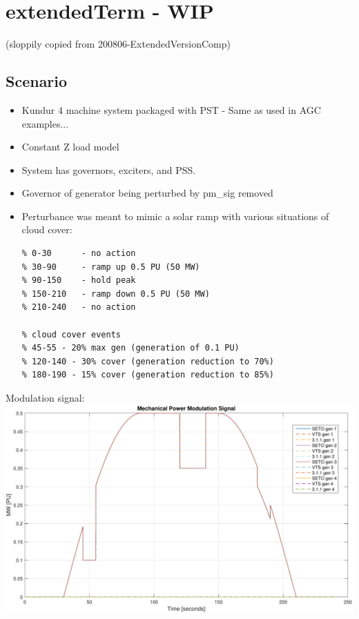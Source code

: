 \section{extendedTerm - WIP}
(sloppily copied from 200806-ExtendedVersionComp)

\subsection{Scenario} 
 \begin{center}
\begin{itemize}
\footnotesize
\raggedright
\singlespacing
\itemsep 0em
\item Kundur  4 machine system packaged with PST - Same as used in AGC examples...
\item Constant Z load model
\item System has governors, exciters, and PSS.
\item Governor of generator being perturbed by pm\_sig removed
\item Perturbance was meant to mimic a solar ramp with various situations of cloud cover:\\
\begin{Verbatim}[fontsize=\scriptsize]
% time [seconds]
% 0-30      - no action
% 30-90     - ramp up 0.5 PU (50 MW)
% 90-150    - hold peak
% 150-210   - ramp down 0.5 PU (50 MW)
% 210-240   - no action

% cloud cover events
% 45-55 - 20% max gen (generation of 0.1 PU)
% 120-140 - 30% cover (generation reduction to 70%)
% 180-190 - 15% cover (generation reduction to 85%)
\end{Verbatim}
\end{itemize}

Modulation signal:
\includegraphics[width=.8\linewidth]{examples/extendedTerm/verPmSig}
\end{center}


\pagebreak
